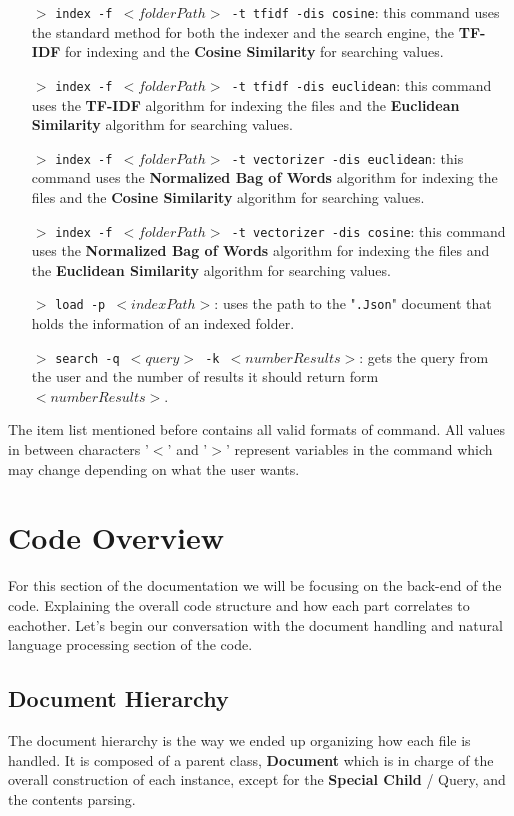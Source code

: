 \documentclass{article}
\begin{document}
\begin{itemize}
    \item[$>$] \texttt{index -f $<folderPath>$ -t tfidf -dis cosine}: this command uses the standard method for both the indexer and the search engine, the \textbf{TF-IDF} for indexing and the \textbf{Cosine Similarity} for searching values. 
    \item[$>$] \texttt{index -f $<folderPath>$ -t tfidf -dis euclidean}: this command uses the \textbf{TF-IDF} algorithm for indexing the files and the \textbf{Euclidean Similarity} algorithm for searching values. 
    \item[$>$] \texttt{index -f $<folderPath>$ -t vectorizer -dis euclidean}: this command uses the \textbf{Normalized Bag of Words} algorithm for indexing the files and the \textbf{Cosine Similarity} algorithm for searching values. 
    \item[$>$] \texttt{index -f $<folderPath>$ -t vectorizer -dis cosine}: this command uses the \textbf{Normalized Bag of Words} algorithm for indexing the files and the \textbf{Euclidean Similarity} algorithm for searching values. 
    \item[$>$] \texttt{load -p $<indexPath>$}: uses the path to the "\texttt{.Json}" document that holds the information of an indexed folder.  
    \item[$>$] \texttt{search -q $<query>$ -k $<numberResults>$}: gets the query from the user and the number of results it should return form $<numberResults>$. 
\end{itemize}

The item list mentioned before contains all valid formats of command. All values in between characters '$<$' and '$>$' represent variables in the command which may change depending on what the user wants.

\section{Code Overview}
For this section of the documentation we will be focusing on the back-end of the code. Explaining the overall code structure and how each part correlates to eachother. Let's begin our conversation with the document handling and natural language processing section of the code.
\subsection{Document Hierarchy}
The document hierarchy is the way we ended up organizing how each file is handled. It is composed of a parent class, \textbf{Document} which is in charge of the overall construction of each instance, except for the \textbf{Special Child} / Query, and the contents parsing. 
\end{document}
